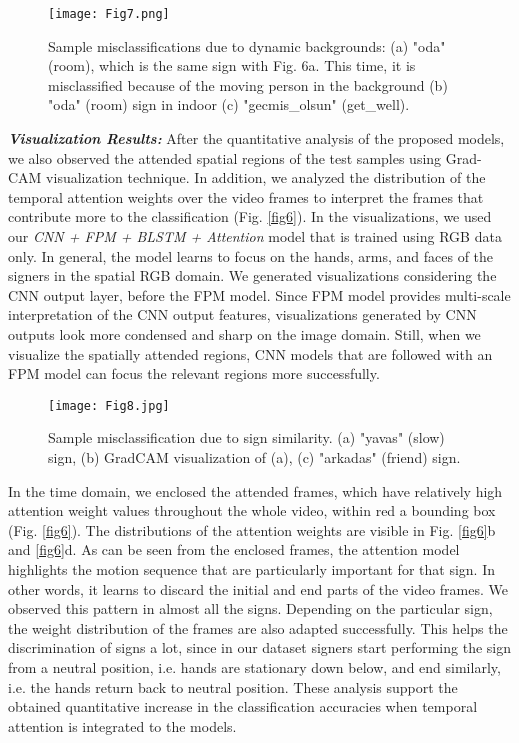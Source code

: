 \documentclass[11pt, a4paper, singlecolumn]{article}
\begin{document}
\begin{figure}
	\centering
	\texttt{[image: Fig7.png]}
	\caption{Sample misclassifications due to dynamic backgrounds: (a) "oda" (room), which is the same sign with Fig. 6a. This time, it is misclassified because of the moving person in the background (b) "oda" (room) sign in indoor (c) "gecmis\_olsun" (get\_well).}
	\label{fig7}
\end{figure}	

	

\textit{\textbf{Visualization Results: }} After the quantitative analysis of the proposed models, we also observed the attended spatial regions of the test samples using Grad-CAM \cite{selvaraju2017grad} visualization technique. In addition, we analyzed the distribution of the temporal attention weights over the video frames to interpret the frames that contribute more to the classification (Fig. \ref{fig6}). In the visualizations, we used our \textit{CNN + FPM + BLSTM + Attention} model that is trained using RGB data only. In general, the model learns to focus on the hands, arms, and faces of the signers in the spatial RGB domain. We generated visualizations considering the CNN output layer, before the FPM model. Since FPM model provides multi-scale interpretation of the CNN output features, visualizations generated by CNN outputs look more condensed and sharp on the image domain. Still, when we visualize the spatially attended regions, CNN models that are followed with an FPM model can focus the relevant regions more successfully. 

\begin{figure}
	
	\centering
	\texttt{[image: Fig8.jpg]}	
	\caption{Sample misclassification due to sign similarity. (a) "yavas" (slow) sign, (b) GradCAM visualization of (a), (c) "arkadas" (friend) sign.}
	\label{fig8} 
\end{figure}

In the time domain, we enclosed the attended frames, which have relatively high attention weight values throughout the whole video, within red a bounding box (Fig. \ref{fig6}). The distributions of the attention weights are visible in Fig. \ref{fig6}b and \ref{fig6}d. As can be seen from the enclosed frames, the attention model highlights the motion sequence that are particularly important for that sign. In other words, it learns to discard the initial and end parts of the video frames. We observed this pattern in almost all the signs. Depending on the particular sign, the weight distribution of the frames are also adapted successfully. This helps the discrimination of signs a lot, since in our dataset signers start performing the sign from a neutral position, i.e. hands are stationary down below, and end similarly, i.e. the hands return back to neutral position. These analysis support the obtained quantitative increase in the classification accuracies when temporal attention is integrated to the models.
\end{document}
